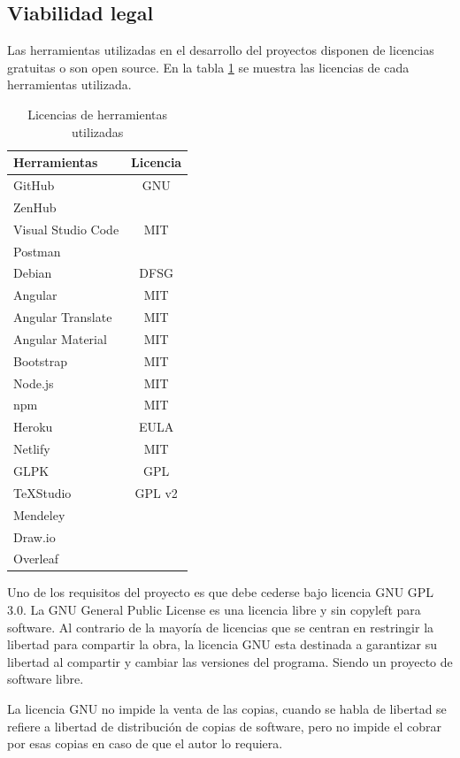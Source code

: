 \subsection{Viabilidad legal}

Las herramientas utilizadas en el desarrollo del proyectos disponen de licencias gratuitas o son open source. En la tabla \ref{fig:herramientaslicense}  se muestra las licencias de cada herramientas utilizada.

\newpage

\begin{table}[h]
    \centering
    \begin{tabular}{l c}
         \textbf{Herramientas} & \textbf{Licencia } \\ 
         \hline
         GitHub & GNU\\
        ZenHub & \\
        Visual Studio Code & MIT \\
        Postman & \\
        Debian & DFSG\\
        Angular & MIT\\
        Angular Translate & MIT\\
        Angular Material & MIT\\
        Bootstrap & MIT\\
        Node.js & MIT\\
        npm & MIT\\
        Heroku & EULA\\
        Netlify & MIT\\
        GLPK &  GPL\\
        \TeX{}Studio & GPL v2 \\
        Mendeley & \\
        Draw.io &\\
        Overleaf &\\
    \end{tabular}
    \caption{Licencias de herramientas utilizadas}
    \label{fig:herramientaslicense}
\end{table}

Uno de los requisitos del proyecto es que debe cederse bajo licencia GNU GPL 3.0. La GNU General Public License \cite{gnu:license} es una licencia libre y sin copyleft para software. Al contrario de la mayoría de licencias que se centran en restringir la libertad para compartir la obra, la licencia GNU esta destinada a garantizar su libertad al compartir y cambiar las versiones del programa. Siendo un proyecto de software libre.

La licencia GNU no impide la venta de las copias, cuando se habla de libertad se refiere a libertad de distribución de copias de software, pero no impide el cobrar por esas copias en caso de que el autor lo requiera.







